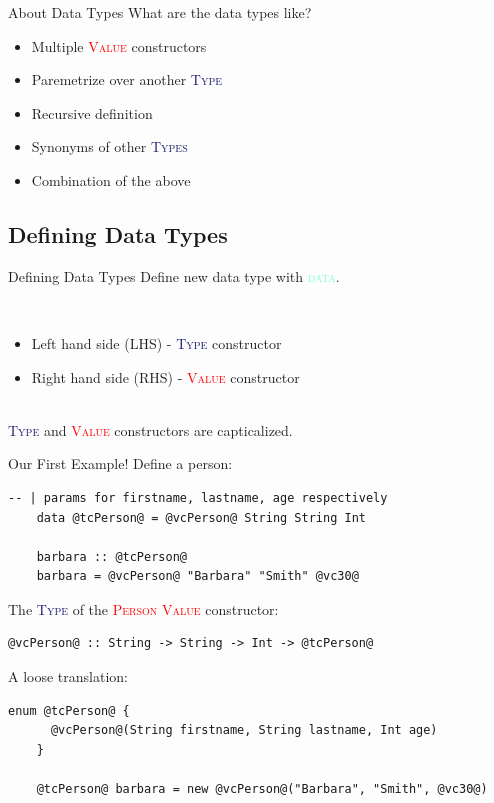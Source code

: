 \documentclass[xcolor={usenames,dvipsnames}]{beamer}
\newcommand{\hkeyword}[1]{\textcolor{Aquamarine}{\textsc{#1}}}
\newcommand{\htycon}[1]{\textcolor{MidnightBlue}{\textsc{#1}}}
\newcommand{\hvalcon}[1]{\textcolor{Red}{\textsc{#1}}}
\begin{document}
\begin{frame}[fragile]{About Data Types}
  What are the data types like?
  \pause
  \begin{itemize}
    \item Multiple \hvalcon{Value} constructors
    \pause
    \item Paremetrize over another \htycon{Type}
    \pause
    \item Recursive definition
    \pause
    \item Synonyms of other \htycon{Types}
    \pause
    \item Combination of the above
  \end{itemize}
\end{frame}

\subsection{Defining Data Types}
\begin{frame}[fragile]{Defining Data Types}
  Define new data type with \hkeyword{data}.

  \pause
  \ \\
  \begin{itemize}
    \item Left hand side (LHS) - \htycon{Type} constructor
    \item Right hand side (RHS) - \hvalcon{Value} constructor
  \end{itemize}

  \pause
  \ \\
  \htycon{Type} and \hvalcon{Value} constructors are capticalized.
\end{frame}

\begin{frame}[fragile]{Our First Example!}
  Define a person:
  \begin{lstlisting}[style=hask]
    -- | params for firstname, lastname, age respectively
    data @tcPerson@ = @vcPerson@ String String Int

    barbara :: @tcPerson@
    barbara = @vcPerson@ "Barbara" "Smith" @vc30@
  \end{lstlisting}

  \pause
  The \htycon{Type} of the \hvalcon{Person Value} constructor:
  \begin{lstlisting}[style=hask]
    @vcPerson@ :: String -> String -> Int -> @tcPerson@
  \end{lstlisting}

  \pause
  A loose translation:
  \begin{lstlisting}[style=hask]
    enum @tcPerson@ {
      @vcPerson@(String firstname, String lastname, Int age)
    }

    @tcPerson@ barbara = new @vcPerson@("Barbara", "Smith", @vc30@)
  \end{lstlisting}
\end{frame}
\end{document}
